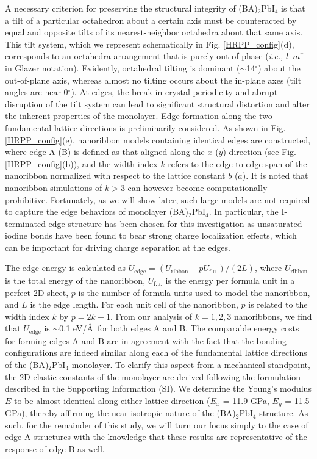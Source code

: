 \documentclass[aps,prl,preprint,11pt,superscriptaddress,bibnotes,amsmath,amssymb,amsfonts,showkeys]{revtex4-2}
\begin{document}
A necessary criterion for preserving the structural integrity of (BA)$_2$PbI$_4$ is that a tilt of a particular octahedron about a certain axis must be counteracted by equal and opposite tilts of its nearest-neighbor octahedra about that same axis. This tilt system, which we represent schematically in Fig. \ref{HRPP_config}(d), corresponds to an octahedra arrangement that is purely out-of-phase (\textit{i.e.,} $l^{^{-}} m^{^{-}}$ in Glazer notation). Evidently, octahedral tilting is dominant ($\sim$14$^\circ$) about the out-of-plane axis, whereas almost no tilting occurs about the in-plane axes (tilt angles are near 0$^\circ$). At edges, the break in crystal periodicity and abrupt disruption of the tilt system can lead to significant structural distortion and alter the inherent properties of the monolayer. Edge formation along the two fundamental lattice directions is preliminarily considered. As shown in Fig. \ref{HRPP_config}(e), nanoribbon models containing identical edges are constructed, where edge A (B) is defined as that aligned along the $x$ ($y$) direction (see Fig. \ref{HRPP_config}(b)), and the width index $k$ refers to the edge-to-edge span of the nanoribbon normalized with respect to the lattice constant $b$ ($a$). It is noted that nanoribbon simulations of $k > 3$ can however become computationally prohibitive. Fortunately, as we will show later, such large models are not required to capture the edge behaviors of monolayer (BA)$_2$PbI$_4$. In particular, the I-terminated edge structure has been chosen for this investigation as unsaturated iodine bonds have been found to bear strong charge localization effects, which can be important for driving charge separation at the edges.\cite{ZFedgesim19}

The edge energy is calculated as $U_{\text{edge}} = (U_{\text{ribbon}} - pU_{\text{f.u.}})/(2L)$, where $U_{\text{ribbon}}$ is the total energy of the nanoribbon, $U_{\text{f.u.}}$ is the energy per formula unit in a perfect 2D sheet, $p$ is the number of formula units used to model the nanoribbon, and $L$ is the edge length. For each unit cell of the nanoribbon, $p$ is related to the width index $k$ by $p = 2k + 1$. From our analysis of $k = 1, 2, 3$ nanoribbons, we find that $U_{\text{edge}}$ is $\sim$0.1 eV/\AA\ for both edges A and B. The comparable energy costs for forming edges A and B are in agreement with the fact that the bonding configurations are indeed similar along each of the fundamental lattice directions of the (BA)$_2$PbI$_4$ monolayer. To clarify this aspect from a mechanical standpoint, the 2D elastic constants of the monolayer are derived following the formulation described in the Supporting Information (SI). We determine the Young's modulus $E$ to be almost identical along either lattice direction ($E_x$ = 11.9 GPa, $E_y$ = 11.5 GPa), thereby affirming the near-isotropic nature of the (BA)$_2$PbI$_4$ structure. As such, for the remainder of this study, we will turn our focus simply to the case of edge A structures with the knowledge that these results are representative of the response of edge B as well.
\end{document}
